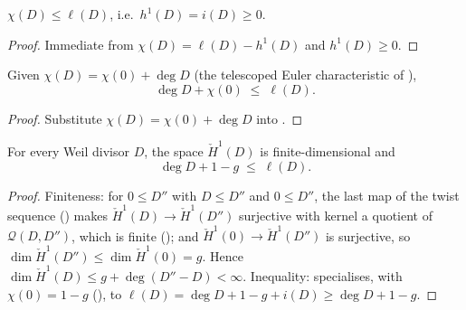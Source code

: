 \begin{lemma}
  \label{lem:adelic_chi_le_ell}
  \leanok
  \(\chi(D) \le \ell(D)\), i.e.\ \(h^1(D) = i(D) \ge 0\).
\end{lemma}
\begin{proof}
  \leanok
  Immediate from \(\chi(D) = \ell(D) - h^1(D)\) and \(h^1(D) \ge 0\).
\end{proof}

\begin{lemma}
  \label{lem:adelic_riemann_inequality_conditional}
  \leanok
  Given \(\chi(D) = \chi(0) + \deg D\) (the telescoped Euler
  characteristic of ),
  \[
    \deg D + \chi(0) \;\le\; \ell(D).
  \]
\end{lemma}
\begin{proof}
  \leanok
  Substitute \(\chi(D) = \chi(0) + \deg D\) into
  .
\end{proof}

\begin{corollary}
  \label{thm:adelic_riemann_inequality}
  For every Weil divisor \(D\), the space \(\check{H}^1(D)\) is
  finite-dimensional and
  \[
    \deg D + 1 - g \;\le\; \ell(D) .
  \]
\end{corollary}
\begin{proof}
  Finiteness: for \(0 \le D''\) with \(D \le D''\) and \(0 \le D''\), the
  last map of the twist sequence
  () makes
  \(\check{H}^1(D) \to \check{H}^1(D'')\) surjective with kernel a
  quotient of \(\mathcal{Q}(D, D'')\), which is finite
  (); and
  \(\check{H}^1(0) \to \check{H}^1(D'')\) is surjective, so
  \(\dim \check{H}^1(D'') \le \dim \check{H}^1(0) = g\). Hence
  \(\dim \check{H}^1(D) \le g + \deg(D'' - D) < \infty\). Inequality:
   specialises, with
  \(\chi(0) = 1-g\)
  (), to
  \(\ell(D) = \deg D + 1 - g + i(D) \ge \deg D + 1 - g\).
\end{proof}

